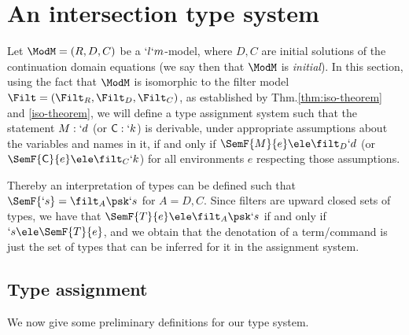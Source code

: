 \documentclass{CSML}
\begin{document}
 \section{An intersection type system} \label{sec:types}

Let ${\ModM} = (R,D,C)$ be a $`l`m$-model, where $D,C$ are initial solutions of the continuation domain equations (we say then that $\ModM$ is \emph{initial}).
In this section, using the fact that ${\ModM}$ is isomorphic to the filter model $\Filt = (\Filt_R,\Filt_D,\Filt_C)$, as established by Thm.\skp\ref{thm:iso-theorem} and \ref{iso-theorem}, we will define a type assignment system such that the statement $M : `d$ (or $\textrm{\sf C}: `k$) is derivable, under appropriate assumptions about the variables and names in it, if and only if $\SemF { M }{ e } \ele \filt_D `d$ (or $\SemF { \Cmd}{ e } \ele \filt_C `k$) for all environments $e$ respecting those assumptions.

Thereby an interpretation of types can be defined such that $\SemF { `s } = \filt_A\psk `s$ for $A=D,C$. Since filters are upward closed sets of types, we have that $\SemF { T}{ e } \ele \filt_A\psk `s$ if and only if $`s \ele \SemF { T}{ e }$,
and we obtain that the denotation of a term/command is just the set of types that can be inferred for it in the assignment system.


 \subsection{Type assignment} \label{subsec:Type assignment}
We now give some preliminary definitions for our type system.
\end{document}
